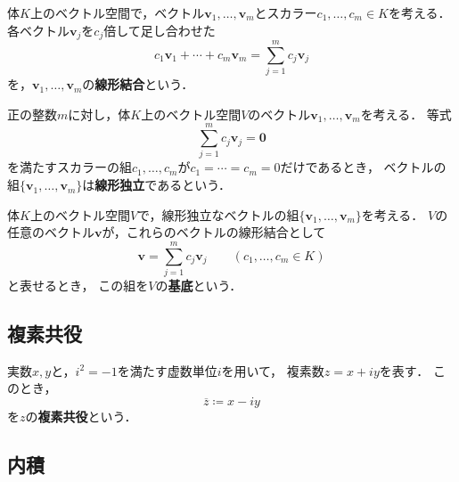 \begin{samepage}
体$K$上のベクトル空間で，ベクトル$\bm{v}_1,\ldots,\bm{v}_m$とスカラー$c_1,\ldots,c_m\in K$を考える．
各ベクトル$\bm{v}_j$を$c_j$倍して足し合わせた
\begin{equation*}
  c_1\bm{v}_1+\cdots+c_m\bm{v}_m
  =\sum_{j=1}^{m}c_j\bm{v}_j
\end{equation*}
を，$\bm{v}_1,\ldots,\bm{v}_m$の\textbf{線形結合}という．

\begin{defi}[線形独立]
  \label{def:linear-independence}
  正の整数$m$に対し，体$K$上のベクトル空間$V$のベクトル$\bm{v}_1,\ldots,\bm{v}_m$を考える．
  等式
  \begin{equation*}
    \sum_{j=1}^{m}c_j\bm{v}_j=\bm{0}
  \end{equation*}
  を満たすスカラーの組$c_1,\ldots,c_m$が$c_1=\cdots=c_m=0$だけであるとき，
  ベクトルの組$\{\bm{v}_1,\ldots,\bm{v}_m\}$は\textbf{線形独立}であるという．
\end{defi}
\end{samepage}

体$K$上のベクトル空間$V$で，線形独立なベクトルの組$\{\bm{v}_1,\ldots,\bm{v}_m\}$を考える．
$V$の任意のベクトル$\bm{v}$が，これらのベクトルの線形結合として
\begin{equation*}
  \bm{v}=\sum_{j=1}^{m}c_j\bm{v}_j
  \qquad(c_1,\ldots,c_m\in K)
\end{equation*}
と表せるとき，
この組を$V$の\textbf{基底}という．

\subsection{複素共役}

\begin{defi}[複素共役]
  実数$x,y$と，$i^2=-1$を満たす虚数単位$i$を用いて，
  複素数$z=x+iy$を表す．
  このとき，
  \begin{equation*}
    \overline{z}\coloneq x-iy
  \end{equation*}
  を$z$の\textbf{複素共役}という．
\end{defi}

\subsection{内積}

